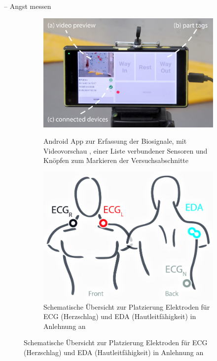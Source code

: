 \begin{frame}{\currentname{} -- Angst messen}
\begin{figure}
	\centering
	\begin{subfigure}[b]{0.49\textwidth}
		\centering
		{
			\includegraphics[width=\textwidth]{include/images/android-app-photo.jpg}
			\label{fig:android-app-preview}
			\label{fig:android-app-parts}
			\label{fig:android-app-devices}
		}
		\captionsetup{subrefformat=parens}
		\caption{Android App zur Erfassung der Biosignale, mit Videovorschau , einer Liste verbundener Sensoren  und Knöpfen zum Markieren der Versuchsabschnitte }
		\label{fig:android-app}
	\end{subfigure}
	\hfill
	\begin{subfigure}[b]{0.49\textwidth}  
		\centering
		\includegraphics[width=\textwidth]{include/images/electrodes.jpg}
		\caption{Schematische Übersicht zur Platzierung Elektroden für ECG (Herzschlag) und EDA (Hautleitfähigkeit) in Anlehnung an \textcite{ECGLeadPlacement2015}}
		\label{fig:electrodes-schema}
	\end{subfigure}
	\label{fig:biosignals}
\end{figure}
\end{frame}

